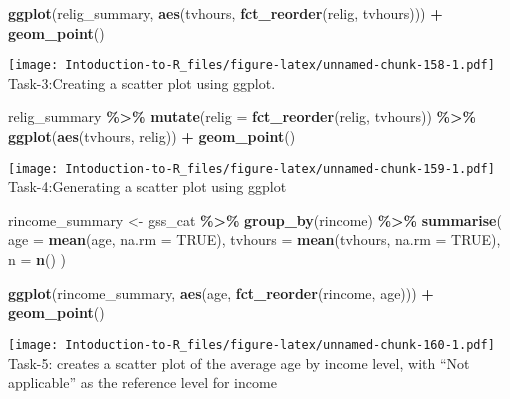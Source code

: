 \documentclass[
]{article}
\newenvironment{Shaded}{\begin{snugshade}}{\end{snugshade}}
\newcommand{\AttributeTok}[1]{\textcolor[rgb]{0.13,0.29,0.53}{#1}}
\newcommand{\ConstantTok}[1]{\textcolor[rgb]{0.56,0.35,0.01}{#1}}
\newcommand{\FunctionTok}[1]{\textcolor[rgb]{0.13,0.29,0.53}{\textbf{#1}}}
\newcommand{\NormalTok}[1]{#1}
\newcommand{\OtherTok}[1]{\textcolor[rgb]{0.56,0.35,0.01}{#1}}
\newcommand{\SpecialCharTok}[1]{\textcolor[rgb]{0.81,0.36,0.00}{\textbf{#1}}}
\begin{document}
\begin{Shaded}
\begin{Highlighting}[]
\FunctionTok{ggplot}\NormalTok{(relig\_summary, }\FunctionTok{aes}\NormalTok{(tvhours, }\FunctionTok{fct\_reorder}\NormalTok{(relig, tvhours))) }\SpecialCharTok{+}
  \FunctionTok{geom\_point}\NormalTok{()}
\end{Highlighting}
\end{Shaded}

\texttt{[image: Intoduction-to-R\_files/figure-latex/unnamed-chunk-158-1.pdf]}
Task-3:Creating a scatter plot using ggplot.

\begin{Shaded}
\begin{Highlighting}[]
\NormalTok{relig\_summary }\SpecialCharTok{\%\textgreater{}\%}
  \FunctionTok{mutate}\NormalTok{(}\AttributeTok{relig =} \FunctionTok{fct\_reorder}\NormalTok{(relig, tvhours)) }\SpecialCharTok{\%\textgreater{}\%}
  \FunctionTok{ggplot}\NormalTok{(}\FunctionTok{aes}\NormalTok{(tvhours, relig)) }\SpecialCharTok{+}
    \FunctionTok{geom\_point}\NormalTok{()}
\end{Highlighting}
\end{Shaded}

\texttt{[image: Intoduction-to-R\_files/figure-latex/unnamed-chunk-159-1.pdf]}
Task-4:Generating a scatter plot using ggplot

\begin{Shaded}
\begin{Highlighting}[]
\NormalTok{rincome\_summary }\OtherTok{\textless{}{-}}\NormalTok{ gss\_cat }\SpecialCharTok{\%\textgreater{}\%}
  \FunctionTok{group\_by}\NormalTok{(rincome) }\SpecialCharTok{\%\textgreater{}\%}
  \FunctionTok{summarise}\NormalTok{(}
    \AttributeTok{age =} \FunctionTok{mean}\NormalTok{(age, }\AttributeTok{na.rm =} \ConstantTok{TRUE}\NormalTok{),}
    \AttributeTok{tvhours =} \FunctionTok{mean}\NormalTok{(tvhours, }\AttributeTok{na.rm =} \ConstantTok{TRUE}\NormalTok{),}
    \AttributeTok{n =} \FunctionTok{n}\NormalTok{()}
\NormalTok{  )}

\FunctionTok{ggplot}\NormalTok{(rincome\_summary, }\FunctionTok{aes}\NormalTok{(age, }\FunctionTok{fct\_reorder}\NormalTok{(rincome, age))) }\SpecialCharTok{+} \FunctionTok{geom\_point}\NormalTok{()}
\end{Highlighting}
\end{Shaded}

\texttt{[image: Intoduction-to-R\_files/figure-latex/unnamed-chunk-160-1.pdf]}
Task-5: creates a scatter plot of the average age by income level, with
``Not applicable'' as the reference level for income
\end{document}
